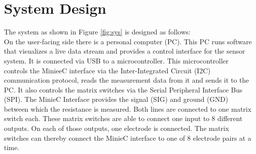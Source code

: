 \section{System Design} \label{sd}

The system as shown in Figure \ref{fig:sys} is designed as follows:\\
On the user-facing side there is a personal computer (PC). This PC runs software that visualizes a live data stream and provides a control interface for the sensor system. It is connected via USB to a microcontroller. This microcontroller controls the MinieeC interface via the Inter-Integrated Circuit (I2C) communication protocol, reads the measurement data from it and sends it to the PC. It also controls the matrix switches via the Serial Peripheral Interface Bus (SPI). The MinieC Interface provides the signal (SIG) and ground (GND) between which the resistance is measured. Both lines are connected to one matrix switch each. These matrix switches are able to connect one input to 8 different outputs. On each of those outputs, one electrode is connected. The matrix switches can thereby connect the MinieC interface to one of 8 electrode pairs at a time.

